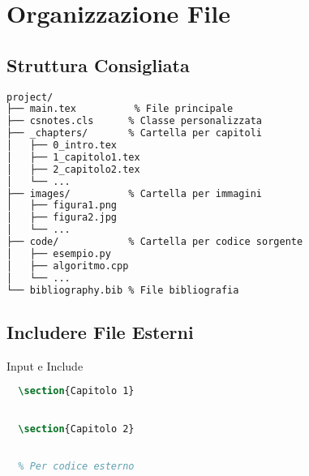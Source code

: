 \documentclass{csnotes}
\begin{document}

\section{Organizzazione File}

\subsection{Struttura Consigliata}

\begin{lstlisting}[language=bash]
project/
├── main.tex          % File principale
├── csnotes.cls      % Classe personalizzata
├── _chapters/       % Cartella per capitoli
│   ├── 0_intro.tex
│   ├── 1_capitolo1.tex
│   ├── 2_capitolo2.tex
│   └── ...
├── images/          % Cartella per immagini
│   ├── figura1.png
│   ├── figura2.jpg
│   └── ...
├── code/            % Cartella per codice sorgente
│   ├── esempio.py
│   ├── algoritmo.cpp
│   └── ...
└── bibliography.bib % File bibliografia
\end{lstlisting}

\subsection{Includere File Esterni}

\begin{example}{Input e Include}
  \begin{lstlisting}[language=TeX]
  % Nel main.tex
  \section{Capitolo 1}
  

  \section{Capitolo 2}
  

  % Per codice esterno
  
  \end{lstlisting}
\end{example}

\end{document}

